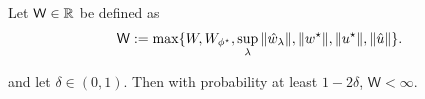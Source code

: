 \begin{prop}\label{cor: uniform bound on weights}
Let $\mathsf{W} \in \mathbb{R}$ be defined as
\begin{equation*}
   \mathsf{W} := \max\{W, W_{\phi^\star}, \sup_\lambda\|\hat{w}_\lambda\|,\|w^\star\|,\|u^\star\|,\|\hat{u}\|\}.
\end{equation*}

and let $\delta \in (0,1)$. 
Then with probability at least $1-2\delta$,
    $\mathsf{W} < \infty$.
\end{prop}

